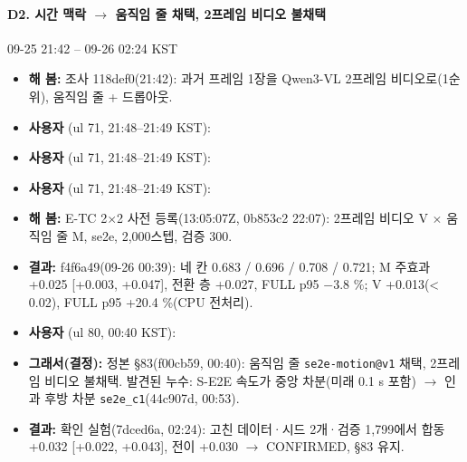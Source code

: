 \paragraph{D2. 시간 맥락 $\rightarrow$ 움직임 줄 채택, 2프레임 비디오 불채택}
{\small 09-25 21:42 -- 09-26 02:24 KST}
\begin{itemize}
  \item \textbf{해 봄:} 조사 118def0(21:42): 과거 프레임 1장을 Qwen3-VL 2프레임 비디오로(1순위), 움직임 줄 + 드롭아웃.
  \item \textbf{사용자} (ul 71, 21:48--21:49 KST): 
  \item \textbf{사용자} (ul 71, 21:48--21:49 KST): 
  \item \textbf{사용자} (ul 71, 21:48--21:49 KST): 
  \item \textbf{해 봄:} E-TC 2$\times$2 사전 등록(13:05:07Z, 0b853c2 22:07): 2프레임 비디오 V $\times$ 움직임 줄 M, se2e, 2,000스텝, 검증 300.
  \item \textbf{결과:} f4f6a49(09-26 00:39): 네 칸 0.683 / 0.696 / 0.708 / 0.721; M 주효과 +0.025 [+0.003, +0.047], 전환 층 +0.027, FULL p95 $-$3.8 \%; V +0.013(< 0.02), FULL p95 +20.4 \%(CPU 전처리).
  \item \textbf{사용자} (ul 80, 00:40 KST): 
  \item \textbf{그래서(결정):} 정본 §83(f00cb59, 00:40): 움직임 줄 \texttt{se2e-\allowbreak{}motion@v1} 채택, 2프레임 비디오 불채택. 발견된 누수: S-E2E 속도가 중앙 차분(미래 0.1 s 포함) $\rightarrow$ 인과 후방 차분 \texttt{se2e\_\allowbreak{}c1}(44c907d, 00:53).
  \item \textbf{결과:} 확인 실험(7dced6a, 02:24): 고친 데이터·시드 2개·검증 1,799에서 합동 +0.032 [+0.022, +0.043], 전이 +0.030 $\rightarrow$ CONFIRMED, §83 유지.
\end{itemize}


